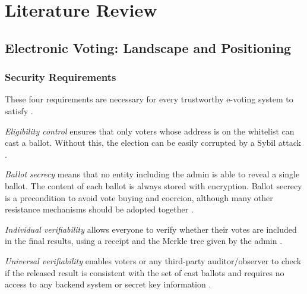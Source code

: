 \chapter{Literature Review}
\begingroup
\justifying
\setlength{\parindent}{0pt}
\setlength{\parskip}{0.5\baselineskip}
\titlespacing{\chapter}{0pt}{0pt}{0pt}
\titlespacing{\section}{0pt}{0pt}{0pt}
\titlespacing{\subsection}{0pt}{0pt}{0pt}

\section{Electronic Voting: Landscape and Positioning}

\subsection{Security Requirements}

These four requirements are necessary for every trustworthy e-voting system to satisfy \cite{benaloh1994,chaum2004}.

\textit{Eligibility control} ensures that only voters whose address is on the whitelist can cast a ballot. Without this, the election can be easily corrupted by a Sybil attack \cite{douceur2002}.

\textit{Ballot secrecy} means that no entity including the admin is able to reveal a single ballot. The content of each ballot is always stored with encryption. Ballot secrecy is a precondition to avoid vote buying and coercion, although many other resistance mechanisms should be adopted together \cite{juels2005}.

\textit{Individual verifiability} allows everyone to verify whether their votes are included in the final results, using a receipt and the Merkle tree given by the admin \cite{chaum2004}.

\textit{Universal verifiability} enables voters or any third-party auditor/observer to check if the released result is consistent with the set of cast ballots and requires no access to any backend system or secret key information \cite{benaloh1994}.

